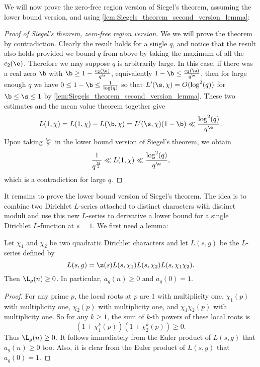     We will now prove the zero-free region version of Siegel's theorem, assuming the lower bound version, and using \cref{lem:Siegels_theorem_second_version_lemma}:

    \begin{proof}[Proof of Siegel's theorem, zero-free region version]
      We we will prove the theorem by contradiction. Clearly the result holds for a single $q$, and notice that the result also holds provided we bound $q$ from above by taking the maximum of all the $c_{2}(\e)$. Therefore we may suppose $q$ is arbitrarily large. In this case, if there was a real zero $\b$ with $\b \ge 1-\frac{c_{2}(\e)}{q^{\e}}$, equivalently $1-\b \le \frac{c_{2}(\e)}{q^{\e}}$, then for large enough $q$ we have $0 \le 1-\b \le \frac{1}{\log(q)}$ so that $L'(\s,\chi) = O(\log^{2}(q))$ for $\b \le \s \le 1$ by \cref{lem:Siegels_theorem_second_version_lemma}. These two estimates and the mean value theorem together give
      \[
        L(1,\chi) = L(1,\chi)-L(\b,\chi) = L'(\s,\chi)(1-\b) \ll \frac{\log^{2}(q)}{q^{\e}}.
      \]
      Upon taking $\frac{\e}{2}$ in the lower bound version of Siegel's theorem, we obtain
      \[
        \frac{1}{q^{\frac{\e}{2}}} \ll L(1,\chi) \ll \frac{\log^{2}(q)}{q^{\e}},
      \]
      which is a contradiction for large $q$.
    \end{proof}

    It remains to prove the lower bound version of Siegel's theorem. The idea is to combine two Dirichlet $L$-series attached to distinct characters with distinct moduli and use this new $L$-series to derivative a lower bound for a single Dirichlet $L$-function at $s = 1$. We first need a lemma:

    \begin{lemma}\label{lem:Siegel_zero_auxiliary_L-function_lemma}
      Let $\chi_{1}$ and $\chi_{2}$ be two quadratic Dirichlet characters and let $L(s,g)$ be the $L$-series defined by
      \[
        L(s,g) = \z(s)L(s,\chi_{1})L(s,\chi_{2})L(s,\chi_{1}\chi_{2}).
      \]
      Then $\L_{g}(n) \ge 0$. In particular, $a_{g}(n) \ge 0$ and $a_{g}(0) = 1$.
    \end{lemma}
    \begin{proof}
      For any prime $p$, the local roots at $p$ are $1$ with multiplicity one, $\chi_{1}(p)$ with multiplicity one, $\chi_{2}(p)$ with multiplicity one, and $\chi_{1}\chi_{2}(p)$ with multiplicity one. So for any $k \ge 1$, the sum of $k$-th powers of these local roots is
      \[
        (1+\chi_{1}^{k}(p))(1+\chi_{2}^{k}(p)) \ge 0.
      \]
      Thus $\L_{g}(n) \ge 0$. It follows immediately from the Euler product of $L(s,g)$ that $a_{g}(n) \ge 0$ too. Also, it is clear from the Euler product of $L(s,g)$ that $a_{g}(0) = 1$.
    \end{proof}

